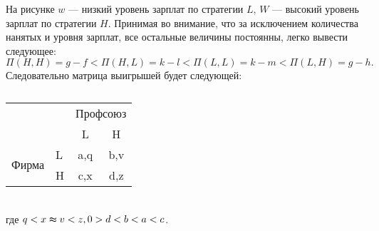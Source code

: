 На рисунке $w$ --- низкий уровень зарплат по стратегии $L$, $W$ --- высокий уровень зарплат по стратегии $H$. 
Принимая во внимание, что за исключением количества нанятых и уровня зарплат, все остальные величины постоянны,
легко вывести следующее:
\begin{equation}
\Pi(H,H)=g-f < \Pi(H,L)=k-l < \Pi(L, L)=k-m < \Pi(L,H)=g-h.
\end{equation}
Следовательно матрица выигрышей будет следующей:
\begin{table}[h]
	
	\centering
	\caption{}
\begin{tabular}{|l|l|c|c|}
	\hline
	\multicolumn{2}{|l|}{\multirow{2}{*}{}} & \multicolumn{2}{l|}{Профсоюз} \\ \cline{3-4} 
	\multicolumn{2}{|l|}{}                  & L                & H                \\ \hline
	\multirow{2}{*}{Фирма}    & L   & a,q              & b,v              \\ \cline{2-4} 
	& H   & c,x              & d,z              \\ \hline
\end{tabular}
	\label{table:firm}
	
\end{table}\\
где $q < x \thickapprox v < z, 0 > d < b < a < c$.
